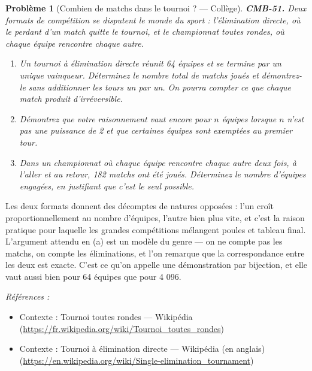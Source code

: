 \documentclass[11pt]{article}
\newtheorem{problem}{Problème}
\newenvironment{refs}{\par\small\noindent\emph{Références :}\begin{itemize}\setlength\itemsep{0pt}}{\end{itemize}\normalsize}
\begin{document}
\bigskip

\begin{problem}[{Combien de matchs dans le tournoi ? --- Collège}]
\textbf{CMB-51.} Deux formats de compétition se disputent le monde du sport : l'élimination
directe, où le perdant d'un match quitte le tournoi, et le championnat toutes rondes, où chaque
équipe rencontre chaque autre.
\begin{enumerate}
\item[(a)] Un tournoi à élimination directe réunit 64 équipes et se termine par un unique vainqueur.
Déterminez le nombre total de matchs joués et démontrez-le sans additionner les tours un par un.
On pourra compter ce que chaque match produit d'irréversible.
\item[(b)] Démontrez que votre raisonnement vaut encore pour $ n $ équipes lorsque $ n $ n'est pas une
puissance de 2 et que certaines équipes sont exemptées au premier tour.
\item[(c)] Dans un championnat où chaque équipe rencontre chaque autre deux fois, à l'aller et au retour,
182 matchs ont été joués. Déterminez le nombre d'équipes engagées, en justifiant que c'est le
seul possible.
\end{enumerate}

\end{problem}

\noindent Les deux formats donnent des décomptes de natures opposées : l'un croît
proportionnellement au nombre d'équipes, l'autre bien plus vite, et c'est la raison pratique pour
laquelle les grandes compétitions mélangent poules et tableau final. L'argument attendu en (a) est
un modèle du genre --- on ne compte pas les matchs, on compte les éliminations, et l'on remarque que
la correspondance entre les deux est exacte. C'est ce qu'on appelle une démonstration par bijection,
et elle vaut aussi bien pour 64 équipes que pour 4 096.

\begin{refs}
\item Contexte : Tournoi toutes rondes --- Wikipédia (\url{https://fr.wikipedia.org/wiki/Tournoi_toutes_rondes})
\item Contexte : Tournoi à élimination directe --- Wikipédia (en anglais) (\url{https://en.wikipedia.org/wiki/Single-elimination_tournament})
\end{refs}

\bigskip
\end{document}
